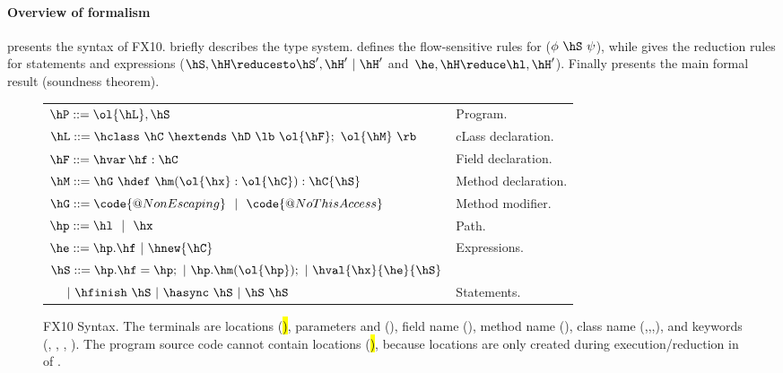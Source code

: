\paragraph{Overview of formalism}
 presents the syntax of FX10.
 briefly describes the type
system.  defines the flow-sensitive rules for
    ($\phi~\hS~\psi$), while
     gives the reduction rules for statements
    and expressions ($\hS,\hH \reducesto \hS',\hH' ~|~\hH'$
    and~$\he,\hH \reduce \hl,\hH'$). Finally 
    presents the main formal result (soundness theorem).



\begin{figure}[htpb!]
\begin{center}
\begin{tabular}{|l|l|}
\hline

$\hP ::= \ol{\hL},\hS$ & Program. \\

$\hL ::= \hclass ~ \hC~\hextends~\hD~\lb~\ol{\hF};~\ol{\hM}~\rb$
& cLass declaration. \\

$\hF ::= \hvar\,\hf:\hC$
& Field declaration. \\

$\hM ::= \hG\ \hdef\ \hm(\ol{\hx}:\ol{\hC}):\hC\{\hS\}$
& Method declaration. \\

$\hG ::= \code{@NonEscaping} ~~|~~ \code{@NoThisAccess}$
& Method modifier. \\

$\hp ::= \hl ~~|~~ \hx$
& Path. \\ %

$\he ::=  \hp.\hf  ~|~ \hnew{\hC}$
& Expressions. \\ %

$\hS ::=  \hp.\hf = \hp; ~|~ \hp.\hm(\ol{\hp});  ~|~ \hval{\hx}{\he}{\hS}$ &\\
$~~~~|~ \hfinish~\hS~|~ \hasync~\hS ~|~ \hS\ \hS$
& Statements. \\ %

\hline
\end{tabular}
\end{center}
\caption{FX10 Syntax.
    The terminals are locations (\hl), parameters and \hthis (\hx), field name (\hf), method name (\hm), class name (\hB,\hC,\hD,\hObject),
        and keywords (\hhnew, \finish, \async, ).
    The program source code cannot contain locations (\hl), because locations are only created during execution/reduction in  of .
    }
\label{Figure:syntax}
\end{figure}

